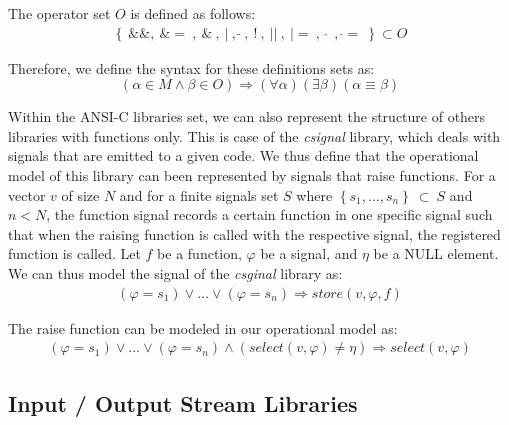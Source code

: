 \documentclass[a4paper]{llncs}
\begin{document}
The operator set $O$ is defined as follows:
%
\begin{eqnarray}
\label{ciso646-operator-set}
\left\{
\: \&\&, 
\: \&= \:, 
\: \& \:, 
\: | \:, 
\: \widetilde{} \:, 
\: ! \:, 
\: || \:, 
\: |= \:, 
\:\: \widehat{} \:\:, 
\: \widehat{}= \: 
\right\} \subset O
\end{eqnarray}

Therefore, we define the syntax for these definitions sets as:
%
\begin{equation}
\left( \alpha \in M \wedge \beta \in O \right) \Rightarrow \left(\forall\alpha\right)\left(\exists\beta\right)\left(\alpha\equiv\beta\right)
\label{eq:csi646-definitions}
\end{equation}

Within the ANSI-C libraries set, we can also represent the structure 
of others libraries with functions only. This is case of the \textit{csignal} 
library, which deals with signals that are emitted to a given code. 
We thus define that the operational model of this library can been represented 
by signals that raise functions. For a vector $v$ of size $N$ and 
for a finite signals set $S$ where $\left\{s_{1},\ldots, s_{n}\right\}\:\subset\:S$ 
and $n < N$, the function signal records a certain function in one specific signal 
such that when the raising function is called with the respective signal, 
the registered function is called. Let $f$ be a function, $\varphi$ be a signal, 
and $\eta$ be a NULL element. We can thus model the signal of the \textit{csginal} library as:
%
\begin{eqnarray}
\label{c-csignal}
\left(\varphi = s_{1}\right) \vee \ldots \vee \left(\varphi = s_{n}\right) \Rightarrow store\left(v,\varphi,f\right)
\end{eqnarray}

The raise function can be modeled in our operational model as:  
%
\begin{eqnarray}
\label{r-csignal}
\left(\varphi = s_{1}\right) \vee \ldots \vee \left(\varphi = s_{n}\right) \wedge \left(select\left(v,\varphi\right) \neq \eta\right) \Rightarrow select\left(v,\varphi\right)  
\end{eqnarray}

\subsection{Input / Output Stream Libraries}
\end{document}
